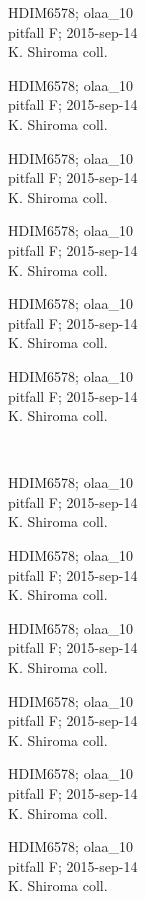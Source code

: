 \documentclass[2pt]{extarticle}
\begin{document}
\noindent
\parbox{0.16\textwidth}{\tiny \raggedright \rule[-0.3\baselineskip]{0pt}{10pt}HDIM6578; olaa\_10\\ pitfall F; 2015-sep-14\\ K. Shiroma coll.}
\parbox{0.16\textwidth}{\tiny \raggedright \rule[-0.3\baselineskip]{0pt}{10pt}HDIM6578; olaa\_10\\ pitfall F; 2015-sep-14\\ K. Shiroma coll.}
\parbox{0.16\textwidth}{\tiny \raggedright \rule[-0.3\baselineskip]{0pt}{10pt}HDIM6578; olaa\_10\\ pitfall F; 2015-sep-14\\ K. Shiroma coll.}
\parbox{0.16\textwidth}{\tiny \raggedright \rule[-0.3\baselineskip]{0pt}{10pt}HDIM6578; olaa\_10\\ pitfall F; 2015-sep-14\\ K. Shiroma coll.}
\parbox{0.16\textwidth}{\tiny \raggedright \rule[-0.3\baselineskip]{0pt}{10pt}HDIM6578; olaa\_10\\ pitfall F; 2015-sep-14\\ K. Shiroma coll.}
\parbox{0.16\textwidth}{\tiny \raggedright \rule[-0.3\baselineskip]{0pt}{10pt}HDIM6578; olaa\_10\\ pitfall F; 2015-sep-14\\ K. Shiroma coll.} \\ 
\vspace{0.001in} 

\noindent
\parbox{0.16\textwidth}{\tiny \raggedright \rule[-0.3\baselineskip]{0pt}{10pt}HDIM6578; olaa\_10\\ pitfall F; 2015-sep-14\\ K. Shiroma coll.}
\parbox{0.16\textwidth}{\tiny \raggedright \rule[-0.3\baselineskip]{0pt}{10pt}HDIM6578; olaa\_10\\ pitfall F; 2015-sep-14\\ K. Shiroma coll.}
\parbox{0.16\textwidth}{\tiny \raggedright \rule[-0.3\baselineskip]{0pt}{10pt}HDIM6578; olaa\_10\\ pitfall F; 2015-sep-14\\ K. Shiroma coll.}
\parbox{0.16\textwidth}{\tiny \raggedright \rule[-0.3\baselineskip]{0pt}{10pt}HDIM6578; olaa\_10\\ pitfall F; 2015-sep-14\\ K. Shiroma coll.}
\parbox{0.16\textwidth}{\tiny \raggedright \rule[-0.3\baselineskip]{0pt}{10pt}HDIM6578; olaa\_10\\ pitfall F; 2015-sep-14\\ K. Shiroma coll.}
\parbox{0.16\textwidth}{\tiny \raggedright \rule[-0.3\baselineskip]{0pt}{10pt}HDIM6578; olaa\_10\\ pitfall F; 2015-sep-14\\ K. Shiroma coll.} \\ 
\vspace{0.001in} 
\end{document}
